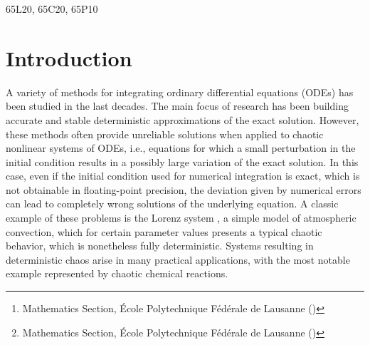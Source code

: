 \documentclass{siamart1116}
\title{{\TheTitle}}
\author{Assyr Abdulle\thanks{Mathematics Section, \'Ecole Polytechnique F\'ed\'erale de Lausanne (\email{assyr.abdulle@epfl.ch})}
		\and
		Giacomo Garegnani\thanks{Mathematics Section, \'Ecole Polytechnique F\'ed\'erale de Lausanne (\email{giacomo.garegnani@epfl.ch})}}
\numberwithin{theorem}{section}
\begin{document}
	
\maketitle	

\begin{abstract} We present a novel probabilistic numerical method for the integration of ODEs based on random time step selection. Theoretical analysis investigating the properties of strong and weak convergence is fully developed. We show that the measure obtained with repeated sampling converges in mean-square sense independently of the number of samples. We present the geometric properties of conservation of polynomial first integrals and symplecticity, which constitute the main advantage with respect to an additive noise method \cite{CGS16}. A complete set of numerical experiments confirms our theoretical findings. 
\end{abstract}

\begin{AMS} 65L20, 65C20, 65P10 \end{AMS}

\section{Introduction} 
A variety of methods for integrating ordinary differential equations (ODEs) has been studied in the last decades. The main focus of research has been building accurate and stable deterministic approximations of the exact solution. However, these methods often provide unreliable solutions when applied to chaotic nonlinear systems of ODEs, i.e., equations for which a small perturbation in the initial condition results in a possibly large variation of the exact solution. In this case, even if the initial condition used for numerical integration is exact, which is not obtainable in floating-point precision, the deviation given by numerical errors can lead to completely wrong solutions of the underlying equation. A classic example of these problems is the Lorenz system \cite{Lor63}, a simple model of atmospheric convection, which for certain parameter values presents a typical chaotic behavior, which is nonetheless fully deterministic. Systems resulting in deterministic chaos arise in many practical applications, with the most notable example represented by chaotic chemical reactions.
\end{document}

